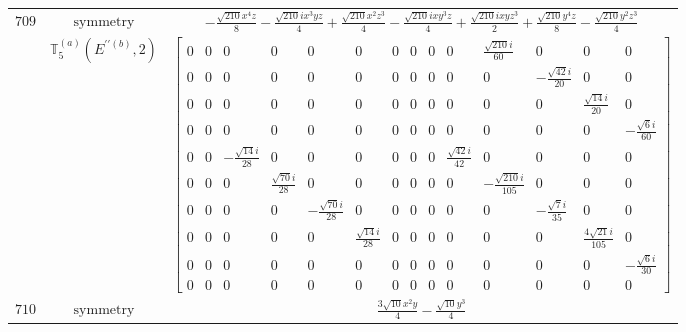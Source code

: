 \documentclass[fleqn,8pt,landscape]{jsarticle}
\begin{document}
\begin{longtable}{ccc}
$ 709 $ & $ \text{symmetry} $ & $ - \frac{\sqrt{210} x^{4} z}{8} - \frac{\sqrt{210} i x^{3} y z}{4} + \frac{\sqrt{210} x^{2} z^{3}}{4} - \frac{\sqrt{210} i x y^{3} z}{4} + \frac{\sqrt{210} i x y z^{3}}{2} + \frac{\sqrt{210} y^{4} z}{8} - \frac{\sqrt{210} y^{2} z^{3}}{4} $ \\
$  $ & $ \mathbb{T}_{5}^{(a)}(E^{\prime\prime(b)},2) $ & $ \begin{bmatrix} 0 & 0 & 0 & 0 & 0 & 0 & 0 & 0 & 0 & 0 & \frac{\sqrt{210} i}{60} & 0 & 0 & 0 \\ 0 & 0 & 0 & 0 & 0 & 0 & 0 & 0 & 0 & 0 & 0 & - \frac{\sqrt{42} i}{20} & 0 & 0 \\ 0 & 0 & 0 & 0 & 0 & 0 & 0 & 0 & 0 & 0 & 0 & 0 & \frac{\sqrt{14} i}{20} & 0 \\ 0 & 0 & 0 & 0 & 0 & 0 & 0 & 0 & 0 & 0 & 0 & 0 & 0 & - \frac{\sqrt{6} i}{60} \\ 0 & 0 & - \frac{\sqrt{14} i}{28} & 0 & 0 & 0 & 0 & 0 & 0 & \frac{\sqrt{42} i}{42} & 0 & 0 & 0 & 0 \\ 0 & 0 & 0 & \frac{\sqrt{70} i}{28} & 0 & 0 & 0 & 0 & 0 & 0 & - \frac{\sqrt{210} i}{105} & 0 & 0 & 0 \\ 0 & 0 & 0 & 0 & - \frac{\sqrt{70} i}{28} & 0 & 0 & 0 & 0 & 0 & 0 & - \frac{\sqrt{7} i}{35} & 0 & 0 \\ 0 & 0 & 0 & 0 & 0 & \frac{\sqrt{14} i}{28} & 0 & 0 & 0 & 0 & 0 & 0 & \frac{4 \sqrt{21} i}{105} & 0 \\ 0 & 0 & 0 & 0 & 0 & 0 & 0 & 0 & 0 & 0 & 0 & 0 & 0 & - \frac{\sqrt{6} i}{30} \\ 0 & 0 & 0 & 0 & 0 & 0 & 0 & 0 & 0 & 0 & 0 & 0 & 0 & 0 \end{bmatrix} $ \\ \hline
$ 710 $ & $ \text{symmetry} $ & $ \frac{3 \sqrt{10} x^{2} y}{4} - \frac{\sqrt{10} y^{3}}{4} $ \\

\end{longtable}
\end{document}
